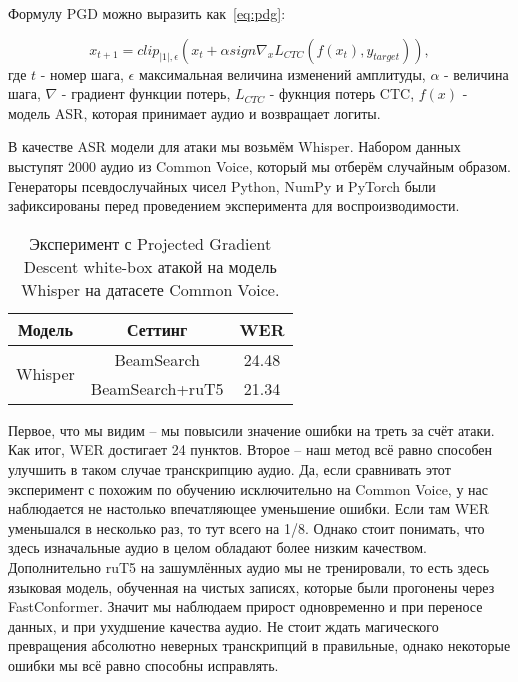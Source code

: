 Формулу PGD можно выразить как~\ref{eq:pdg}:

\begin{equation}
  x_{t+1} = clip_{|1|, \epsilon}(x_t + \alpha sign \nabla_x L_{CTC}(f(x_t), y_{target})),
  \label{eq:pdg}
\end{equation}
где $t$ - номер шага, $\epsilon$ максимальная величина изменений амплитуды, $\alpha$ - величина шага, $\nabla$ - градиент функции потерь, $L_{CTC}$ - фукнция потерь CTC, $f(x)$ - модель ASR, которая принимает аудио и возвращает логиты.

В качестве ASR модели для атаки мы возьмём Whisper.
Набором данных выступят 2000 аудио из Common Voice, который мы отберём случайным образом.
Генераторы псевдослучайных чисел Python, NumPy и PyTorch были зафиксированы перед проведением эксперимента для воспроизводимости.

\begin{table}[]
\centering
\caption{Эксперимент с Projected Gradient Descent white-box атакой на модель Whisper на датасете Common Voice.}
\begin{tabular}{|c|c|c|}
\hline
Модель                         & Сеттинг                              & WER     \\ \hline
\multirow{2}{*}{Whisper}       & BeamSearch                           & 24.48   \\ \cline{2-3} 
                               & BeamSearch+ruT5                      & 21.34   \\ \hline
\end{tabular}
\label{tab:pgd}
\end{table}

Первое, что мы видим -- мы повысили значение ошибки на треть за счёт атаки.
Как итог, WER достигает 24 пунктов.
Второе -- наш метод всё равно способен улучшить в таком случае транскрипцию аудио.
Да, если сравнивать этот эксперимент с похожим по обучению исключительно на Common Voice, у нас наблюдается не настолько впечатляющее уменьшение ошибки.
Если там WER уменьшался в несколько раз, то тут всего на 1/8.
Однако стоит понимать, что здесь изначальные аудио в целом обладают более низким качеством.
Дополнительно ruT5 на зашумлённых аудио мы не тренировали, то есть здесь языковая модель, обученная на чистых записях, которые были прогонены через FastConformer.
Значит мы наблюдаем прирост одновременно и при переносе данных, и при ухудшение качества аудио.
Не стоит ждать магического превращения абсолютно неверных транскрипций в правильные, однако некоторые ошибки мы всё равно способны исправлять.

